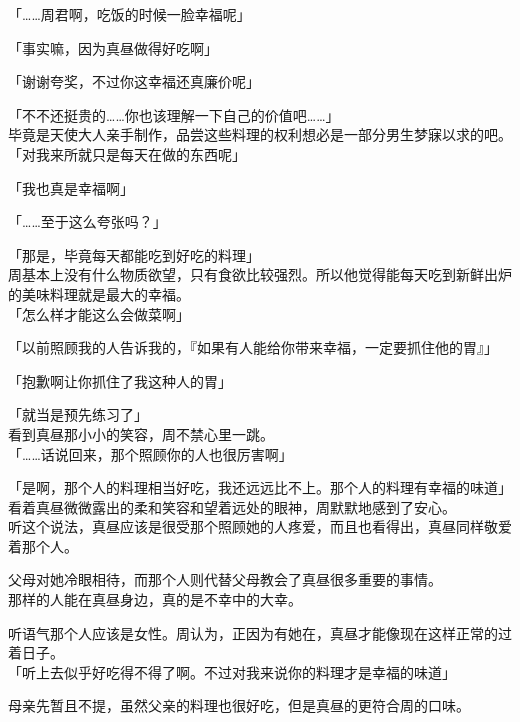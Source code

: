 「……周君啊，吃饭的时候一脸幸福呢」

「事实嘛，因为真昼做得好吃啊」

「谢谢夸奖，不过你这幸福还真廉价呢」

「不不还挺贵的……你也该理解一下自己的价值吧……」\\

毕竟是天使大人亲手制作，品尝这些料理的权利想必是一部分男生梦寐以求的吧。\\

「对我来所就只是每天在做的东西呢」

「我也真是幸福啊」

「……至于这么夸张吗？」

「那是，毕竟每天都能吃到好吃的料理」\\

周基本上没有什么物质欲望，只有食欲比较强烈。所以他觉得能每天吃到新鲜出炉的美味料理就是最大的幸福。\\

「怎么样才能这么会做菜啊」

「以前照顾我的人告诉我的，『如果有人能给你带来幸福，一定要抓住他的胃』」

「抱歉啊让你抓住了我这种人的胃」

「就当是预先练习了」\\

看到真昼那小小的笑容，周不禁心里一跳。\\

「……话说回来，那个照顾你的人也很厉害啊」

「是啊，那个人的料理相当好吃，我还远远比不上。那个人的料理有幸福的味道」\\

看着真昼微微露出的柔和笑容和望着远处的眼神，周默默地感到了安心。\\

听这个说法，真昼应该是很受那个照顾她的人疼爱，而且也看得出，真昼同样敬爱着那个人。

父母对她冷眼相待，而那个人则代替父母教会了真昼很多重要的事情。\\

那样的人能在真昼身边，真的是不幸中的大幸。

听语气那个人应该是女性。周认为，正因为有她在，真昼才能像现在这样正常的过着日子。\\

「听上去似乎好吃得不得了啊。不过对我来说你的料理才是幸福的味道」

母亲先暂且不提，虽然父亲的料理也很好吃，但是真昼的更符合周的口味。\\


